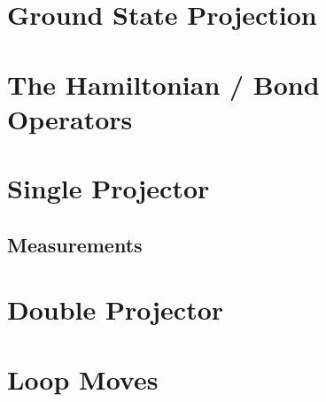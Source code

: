 \section{Ground State Projection}
\section{The Hamiltonian / Bond Operators}
\section{Single Projector}
\subsection{Measurements}
\section{Double Projector}
\section{Loop Moves}
